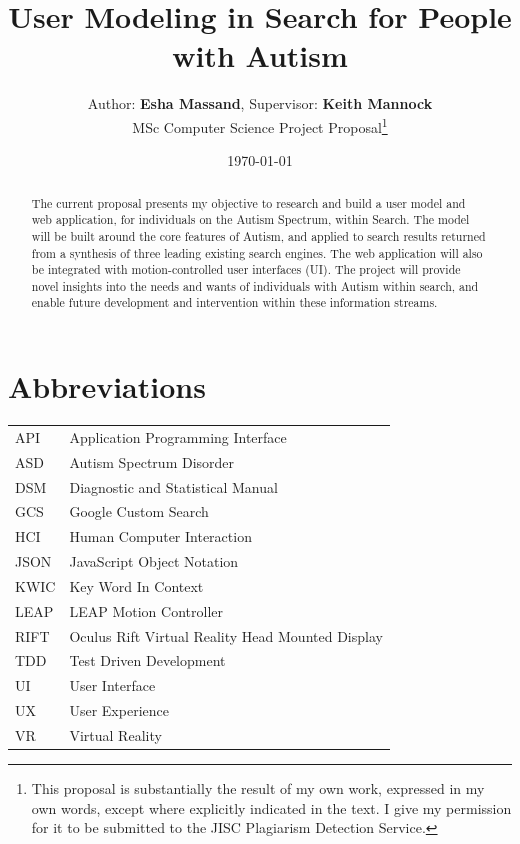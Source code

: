 \documentclass[a4paper, 10pt]{article}
\begin{document}
\title{User Modeling in Search for People with Autism}
\author{Author: \textbf{Esha Massand}, Supervisor: \textbf{Keith Mannock}\\
MSc Computer Science Project Proposal\footnote{This proposal is substantially the result of my own work, expressed in my own words, except where explicitly indicated in the text. I give my permission for it to be submitted to the JISC Plagiarism Detection Service. }}
\date{\today}
\maketitle
\begin{abstract}
The current proposal presents my objective to research and build a user model and web application, for individuals on the Autism Spectrum, within Search. The model will be built around the core features of Autism, and applied to search results returned from a synthesis of three leading existing search engines. The web application will also be integrated with motion-controlled user interfaces (UI). The project will provide novel insights into the needs and wants of individuals with Autism within search, and enable future development and intervention within these information streams.
\end{abstract}

\tableofcontents

\section*{Abbreviations}
\begin{tabular}{l l }
API & Application Programming Interface\\
ASD & Autism Spectrum Disorder\\
DSM & Diagnostic and Statistical Manual\\
GCS & Google Custom Search\\
HCI & Human Computer Interaction\\
JSON & JavaScript Object Notation\\
KWIC & Key Word In Context\\
LEAP & LEAP Motion Controller\\
RIFT & Oculus Rift Virtual Reality Head Mounted Display\\
TDD & Test Driven Development\\
UI & User Interface\\
UX & User Experience\\
VR & Virtual Reality\\
\end{tabular}
\end{document}
